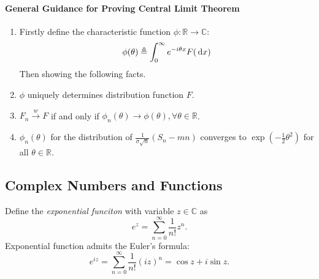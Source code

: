 \paragraph{General Guidance for Proving Central Limit Theorem}
\begin{enumerate}
\item
Firstly define the characteristic function $\phi:\mathbb{R}\to\mathbb{C}$:
\[
\phi(\theta)\triangleq \int_0^\infty e^{-i\theta x}F(\,\mathrm{d} x)
\]
Then showing the following facts.
\item
$\phi$ uniquely determines distribution function $F$.
\item
$F_n\xrightarrow{w}F$ if and only if $\phi_n(\theta)\to\phi(\theta),\forall \theta\in\mathbb{R}$.
\item
$\phi_n(\theta)$ for the distribution of $\frac{1}{\sigma\sqrt{n}}(S_n - mn)$ converges to $\exp(-\frac{1}{2}\theta^2)$ for all $\theta\in\mathbb{R}$.
\end{enumerate}

\subsection{Complex Numbers and Functions}

\begin{definition}
Define the \emph{exponential funciton} with variable $z\in\mathbb{C}$ as
\[
e^z = \sum_{n=0}^\infty\frac{1}{n!}z^n.
\]
Exponential function admits the Euler's formula:
\[
e^{iz} = \sum_{n=0}^\infty\frac{1}{n!}(iz)^n = \cos z + i\sin z.
\]
\end{definition}







%
